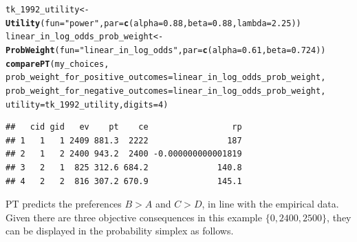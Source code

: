\documentclass{article}\usepackage[]{graphicx}\usepackage[]{color}
\makeatletter
\newcommand{\hlnum}[1]{\textcolor[rgb]{0.686,0.059,0.569}{#1}}%
\newcommand{\hlstr}[1]{\textcolor[rgb]{0.192,0.494,0.8}{#1}}%
\newcommand{\hlstd}[1]{\textcolor[rgb]{0.345,0.345,0.345}{#1}}%
\newcommand{\hlkwb}[1]{\textcolor[rgb]{0.69,0.353,0.396}{#1}}%
\newcommand{\hlkwc}[1]{\textcolor[rgb]{0.333,0.667,0.333}{#1}}%
\newcommand{\hlkwd}[1]{\textcolor[rgb]{0.737,0.353,0.396}{\textbf{#1}}}%
\newenvironment{kframe}{%
 \def\at@end@of@kframe{}%
 \ifinner\ifhmode%
  \def\at@end@of@kframe{\end{minipage}}%
  \begin{minipage}{\columnwidth}%
 \fi\fi%
 \def\FrameCommand##1{\hskip\@totalleftmargin \hskip-\fboxsep
 \colorbox{shadecolor}{##1}\hskip-\fboxsep
     \hskip-\linewidth \hskip-\@totalleftmargin \hskip\columnwidth}%
 \MakeFramed {\advance\hsize-\width
   \@totalleftmargin\z@ \linewidth\hsize
   \@setminipage}}%
 {\par\unskip\endMakeFramed%
 \at@end@of@kframe}
\newenvironment{knitrout}{}{} %
\makeatother
\begin{document}
\begin{knitrout}
\color{fgcolor}\begin{kframe}
\begin{alltt}
\hlstd{tk_1992_utility} \hlkwb{<-} \hlkwd{Utility}\hlstd{(}\hlkwc{fun}\hlstd{=}\hlstr{"power"}\hlstd{,} \hlkwc{par}\hlstd{=}\hlkwd{c}\hlstd{(}\hlkwc{alpha}\hlstd{=}\hlnum{0.88}\hlstd{,} \hlkwc{beta}\hlstd{=}\hlnum{0.88}\hlstd{,} \hlkwc{lambda}\hlstd{=}\hlnum{2.25}\hlstd{))}
\hlstd{linear_in_log_odds_prob_weight} \hlkwb{<-} \hlkwd{ProbWeight}\hlstd{(}\hlkwc{fun}\hlstd{=}\hlstr{"linear_in_log_odds"}\hlstd{,} \hlkwc{par}\hlstd{=}\hlkwd{c}\hlstd{(}\hlkwc{alpha}\hlstd{=}\hlnum{0.61}\hlstd{,} \hlkwc{beta}\hlstd{=}\hlnum{0.724}\hlstd{))}
\hlkwd{comparePT}\hlstd{(my_choices,}
        \hlkwc{prob_weight_for_positive_outcomes}\hlstd{=linear_in_log_odds_prob_weight,}
        \hlkwc{prob_weight_for_negative_outcomes}\hlstd{=linear_in_log_odds_prob_weight,}
        \hlkwc{utility}\hlstd{=tk_1992_utility,} \hlkwc{digits}\hlstd{=}\hlnum{4}\hlstd{)}
\end{alltt}
\begin{verbatim}
##   cid gid   ev    pt    ce                 rp
## 1   1   1 2409 881.3  2222                187
## 2   1   2 2400 943.2  2400 -0.000000000001819
## 3   2   1  825 312.6 684.2              140.8
## 4   2   2  816 307.2 670.9              145.1
\end{verbatim}
\end{kframe}
\end{knitrout}


PT predicts the preferences $B > A$ and $C > D$, in line with the empirical data.
Given there are three objective consequences in this example $\{0, 2400, 2500\}$, they can be displayed in the probability simplex \citep*{Marschak_1950, Machina_1987} as follows.
\end{document}
